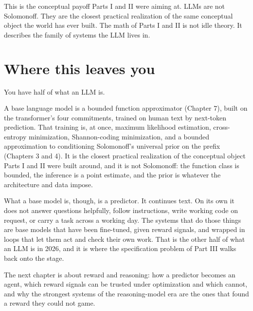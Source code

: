 This is the conceptual payoff Parts I and II were aiming at. LLMs are not Solomonoff. They are the closest practical realization of the same conceptual object the world has ever built. The math of Parts I and II is not idle theory. It describes the family of systems the LLM lives in.

\section*{Where this leaves you}

You have half of what an LLM is.

A base language model is a bounded function approximator (Chapter 7), built on the transformer's four commitments, trained on human text by next-token prediction. That training is, at once, maximum likelihood estimation, cross-entropy minimization, Shannon-coding minimization, and a bounded approximation to conditioning Solomonoff's universal prior on the prefix (Chapters 3 and 4). It is the closest practical realization of the conceptual object Parts I and II were built around, and it is not Solomonoff: the function class is bounded, the inference is a point estimate, and the prior is whatever the architecture and data impose.

What a base model is, though, is a predictor. It continues text. On its own it does not answer questions helpfully, follow instructions, write working code on request, or carry a task across a working day. The systems that do those things are base models that have been fine-tuned, given reward signals, and wrapped in loops that let them act and check their own work. That is the other half of what an LLM is in 2026, and it is where the specification problem of Part III walks back onto the stage.

The next chapter is about reward and reasoning: how a predictor becomes an agent, which reward signals can be trusted under optimization and which cannot, and why the strongest systems of the reasoning-model era are the ones that found a reward they could not game.
